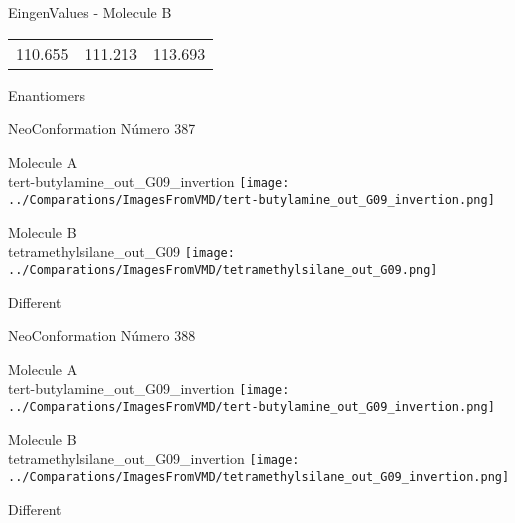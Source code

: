 \begin{multicols}{2}
\begin{center}
\vtab
 EingenValues - Molecule B     \\
\vtab
\begin{tabular}{|c c c|}
110.655	 & 	111.213	 & 	113.693	 \\
\end{tabular}

\end{center}
\end{multicols}
\begin{center}
\vtab
\vtab
\textcolor{NavyBlue}{\Large Enantiomers}
\end{center}

 \newpage

\vtab[-2cm]
\begin{center}
{\large NeoConformation \tab Número 387}
\end{center}
\begin{multicols}{2}
\begin{center}
Molecule A \\ 
tert-butylamine\_out\_G09\_invertion
\texttt{[image: ../Comparations/ImagesFromVMD/tert-butylamine\_out\_G09\_invertion.png]}
\\
\vtab

\columnbreak
Molecule B \\ 
tetramethylsilane\_out\_G09
\texttt{[image: ../Comparations/ImagesFromVMD/tetramethylsilane\_out\_G09.png]}
\\
\vtab


\end{center}
\end{multicols}
\begin{center}
\vtab
\vtab
\textcolor{NavyBlue}{\Large Different}
\end{center}

 \newpage

\vtab[-2cm]
\begin{center}
{\large NeoConformation \tab Número 388}
\end{center}
\begin{multicols}{2}
\begin{center}
Molecule A \\ 
tert-butylamine\_out\_G09\_invertion
\texttt{[image: ../Comparations/ImagesFromVMD/tert-butylamine\_out\_G09\_invertion.png]}
\\
\vtab

\columnbreak
Molecule B \\ 
tetramethylsilane\_out\_G09\_invertion
\texttt{[image: ../Comparations/ImagesFromVMD/tetramethylsilane\_out\_G09\_invertion.png]}
\\
\vtab


\end{center}
\end{multicols}
\begin{center}
\vtab
\vtab
\textcolor{NavyBlue}{\Large Different}
\end{center}

